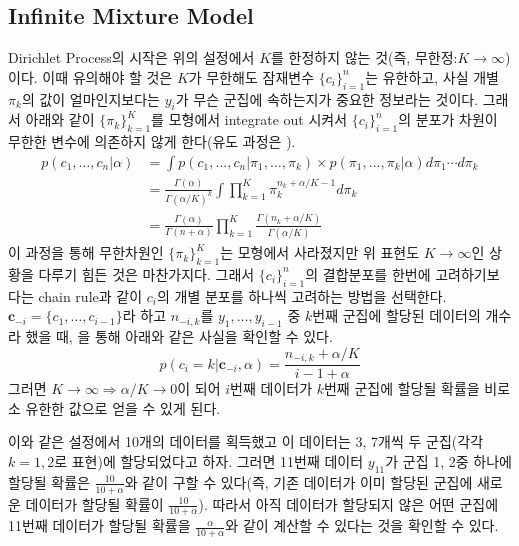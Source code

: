 \documentclass{article}
\begin{document}
\subsection{Infinite Mixture Model}
Dirichlet Process의 시작은 위의 설정에서 $K$를 한정하지 않는 것(즉, 무한정:$K\to\infty$)이다.
이때 유의해야 할 것은 $K$가 무한해도 잠재변수 $\{c_i\}_{i=1}^n$는 유한하고, 사실 개별 $\pi_k$의 값이 얼마인지보다는 $y_i$가 무슨 군집에 속하는지가 중요한 정보라는 것이다.
그래서 아래와 같이 $\{\pi_k\}_{k=1}^{K}$를 모형에서 integrate out 시켜서 $\{c_i\}_{i=1}^n$의 분포가 차원이 무한한 변수에 의존하지 않게 한다(유도 과정은 \cite{Li2019}).
\begin{equation*}
    \begin{aligned}
    p\left(c_{1}, \ldots, c_{n} | \alpha\right)&= \int p\left(c_{1}, \ldots, c_{n} | \pi_{1}, \ldots, \pi_{k}\right) \times p\left(\pi_{1}, \ldots, \pi_{k} | \alpha\right) d \pi_{1} \cdots d \pi_{k} \\
    &=\frac{\Gamma(\alpha)}{\Gamma(\alpha / K)^{k}} \int \prod_{k=1}^{K} \pi_{k}^{n_{k}+\alpha / K-1} d \pi_{k} \\
    &=\frac{\Gamma(\alpha)}{\Gamma(n+\alpha)} \prod_{k=1}^{K} \frac{\Gamma\left(n_{k}+\alpha / K\right)}{\Gamma(\alpha / K)}
    \end{aligned}
\end{equation*}
이 과정을 통해 무한차원인 $\{\pi_k\}_{k=1}^{K}$는 모형에서 사라졌지만 위 표현도 $K\to\infty$인 상황을 다루기 힘든 것은 마찬가지다.
그래서 $\{c_i\}_{i=1}^n$의 결합분포를 한번에 고려하기보다는 chain rule과 같이 $c_i$의 개별 분포를 하나씩 고려하는 방법을 선택한다.
$\mathbf{c}_{-i}=\{c_1,\ldots,c_{i-1}\}$라 하고 $n_{-i,k}$를 $y_1,\ldots,y_{i-1}$ 중 $k$번째 군집에 할당된 데이터의 개수라 했을 때, \cite{Li2019}을 통해 아래와 같은 사실을 확인할 수 있다.
\begin{equation}
    p\left(c_{i}=k | \boldsymbol{c}_{-i}, \alpha\right)=\frac{n_{-i, k}+\alpha / K}{i-1+\alpha}
\end{equation}
그러면 $K\to\infty\Rightarrow\alpha/K\to 0$이 되어 $i$번째 데이터가 $k$번째 군집에 할당될 확률을 비로소 유한한 값으로 얻을 수 있게 된다.\bigskip

\noindent 이와 같은 설정에서 10개의 데이터를 획득했고 이 데이터는 3, 7개씩 두 군집(각각 $k=1, 2$로 표현)에 할당되었다고 하자.
그러면 11번째 데이터 $y_{11}$가 군집 1, 2중 하나에 할당될 확률은 $\frac{10}{10+\alpha}$와 같이 구할 수 있다(즉, 기존 데이터가 이미 할당된 군집에 새로운 데이터가 할당될 확률이 $\frac{10}{10+\alpha}$).
따라서 아직 데이터가 할당되지 않은 어떤 군집에 11번째 데이터가 할당될 확률을 $\frac{\alpha}{10+\alpha}$와 같이 계산할 수 있다는 것을 확인할 수 있다.\bigskip
\end{document}
